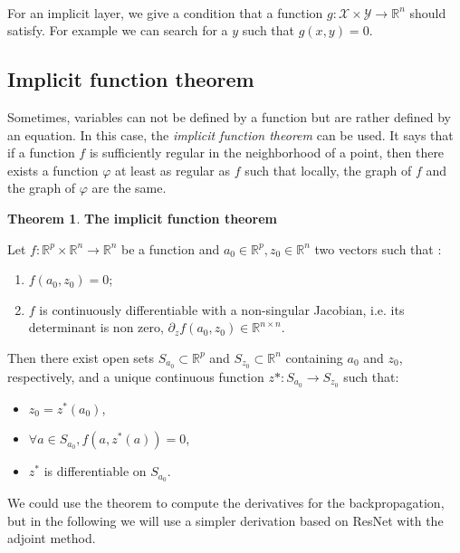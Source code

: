 \documentclass[10pt,a4paper]{article}
\theoremstyle{definition}
\theoremstyle{definition}
\newtheorem{theorem}{Theorem}
\theoremstyle{definition}
\begin{document}
~

For an implicit layer, we give a condition that a function $g: \mathcal{X} \times \mathcal{Y} \rightarrow \mathbb{R}^n$ should satisfy. For example we can search for a $y$ such that $g(x,y) = 0$.



\subsection{Implicit function theorem}

Sometimes, variables can not be defined by a function but are rather defined by an equation. In this case, the \textit{implicit function theorem} can be used. It says that if a function $f$ is sufficiently regular in the neighborhood of a point, then there exists a function $\varphi$ at least as regular as $f$ such that locally, the graph of $f$ and the graph of $\varphi$ are the same.

\begin{theorem}{\textbf{The implicit function theorem}}

Let $f: \mathbb{R}^p \times \mathbb{R}^n \rightarrow \mathbb{R}^n$ be a function and $a_0 \in \mathbb{R}^p , z_0 \in \mathbb{R}^n$ two vectors such that :

\begin{enumerate}
\item $f(a_0,z_0) = 0$;
\item $f$ is continuously differentiable with a non-singular Jacobian, i.e. its determinant is non zero, $\partial_z f(a_0,z_0) \in \mathbb{R}^{n \times n}$.
\end{enumerate}
Then there exist open sets $S_{a_0} \subset \mathbb{R}^p$ and $S_{z_0} \subset \mathbb{R}^n$ containing $a_0$ and $z_0$, respectively, and a unique continuous function $z*:S_{a_0} \rightarrow S_{z_0}$ such that:
\begin{itemize}
\item $z_0=z^*(a_0)$,
\item $ \forall a \in S_{a_0}, f(a,z^*(a))=0$,
\item $z^*$ is differentiable on $S_{a_0}$.
\end{itemize}
\end{theorem}

We could use the theorem to compute the derivatives for the backpropagation, but in the following we will use a simpler derivation based on ResNet with the adjoint method.
\end{document}
